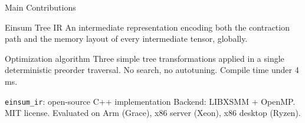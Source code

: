 \documentclass[aspectratio=169,10pt]{beamer}
\begin{document}
\begin{frame}{Main Contributions}

\begin{block}{Einsum Tree IR}
\medskip
An intermediate representation encoding both the contraction path and the memory
layout of every intermediate tensor, globally.
\end{block}

\medskip
\begin{block}{Optimization algorithm}
\medskip
Three simple tree transformations applied in a single deterministic preorder traversal.
No search, no autotuning. Compile time under 4\,ms.
\end{block}

\medskip
\begin{block}{\texttt{einsum\_ir}: open-source C++ implementation}
\medskip
Backend: LIBXSMM + OpenMP. MIT license.
Evaluated on Arm (Grace), x86 server (Xeon), x86 desktop (Ryzen).
\end{block}
\end{frame}
\end{document}
